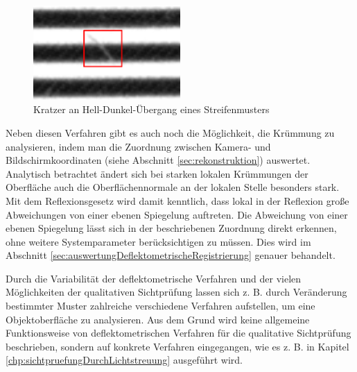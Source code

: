 \begin{figure}[H]
	\centering
	\includegraphics[width=0.5\textwidth]{02_grundlagenDerDeflektometrie/qualitativeSichtpruefung/figures/scratch}
	\caption[Kratzer an Hell-Dunkel-Übergang eines Streifenmusters]{Kratzer an Hell-Dunkel-Übergang eines Streifenmusters}
	\label{img:scratch}
\end{figure}

\noindent
Neben diesen Verfahren gibt es auch noch die Möglichkeit, die Krümmung zu analysieren, indem man die Zuordnung zwischen Kamera- und Bildschirmkoordinaten (siehe Abschnitt \ref{sec:rekonstruktion}) auswertet.
Analytisch betrachtet ändert sich bei starken lokalen Krümmungen der Oberfläche auch die Oberflächennormale an der lokalen Stelle besonders stark.
Mit dem Reflexionsgesetz wird damit kenntlich, dass lokal in der Reflexion große Abweichungen von einer ebenen Spiegelung auftreten.
Die Abweichung von einer ebenen Spiegelung lässt sich in der beschriebenen Zuordnung direkt erkennen, ohne weitere Systemparameter berücksichtigen zu müssen.
Dies wird im Abschnitt \ref{sec:auswertungDeflektometrischeRegistrierung} genauer behandelt.

\p
Durch die Variabilität der deflektometrische Verfahren und der vielen Möglichkeiten der qualitativen Sichtprüfung lassen sich z. B. durch Veränderung bestimmter Muster zahlreiche verschiedene Verfahren aufstellen, um eine Objektoberfläche zu analysieren.
Aus dem Grund wird keine allgemeine Funktionsweise von deflektometrischen Verfahren für die qualitative Sichtprüfung beschrieben, sondern auf konkrete Verfahren eingegangen, wie es z. B. in Kapitel \ref{chp:sichtpruefungDurchLichtstreuung} ausgeführt wird.